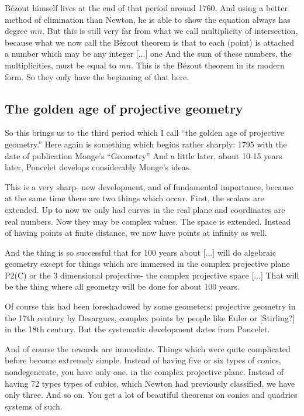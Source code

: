 \documentclass{article}
\begin{document}
B\'ezout himself lives 
at the end of that period around 1760.
And using a better method of elimination than Newton,
he is able to show the equation always has degree $mn$.
But this is still very far 
from what we call multiplicity of intersection,
because what we now call the B\'ezout theorem 
is that to each (point) is attached a number 
which may be any integer [...] one
And the sum of these numbers, the multiplicities, 
must be equal to $mn$.
This is the B\'ezout theorem in its modern form.
So they only have the beginning of that here.

\subsection{The golden age of projective geometry}
So this brings us to the third period
which I call ``the golden age of projective geometry.''
Here again is something which begins rather sharply:
1795 with the date of publication Monge's ``Geometry''
And a little later, about 10-15 years later,
Poncelet develops considerably Monge's ideas.

This is a very sharp- new development,
and of fundamental importance, because
at the same time there are two things which occur.
First, the scalars are extended.
Up to now we only had curves in the real plane 
and coordinates are real numbers.
Now they may be complex values.
The space is extended.
Instead of having points at finite distance, 
we now have points at infinity as well.

And the thing is so successful that for 100 years about [...] 
will do algebraic geometry 
except for things which are immersed 
in the complex projective plane P2(C) 
or the 3 dimensional projective- 
the complex projective space [...]
That will be the thing 
where all geometry will be done for about 100 years.

Of course this had been foreshadowed by some geometers:
projective geometry in the 17th century by Desargues,
complex points by people like Euler or [Stirling?] 
in the 18th century.
But the systematic development dates from Poncelet.

And of course the rewards are immediate.
Things which were quite complicated before 
become extremely simple.
Instead of having five or six types of conics, 
nondegenerate, you have only one. 
in the complex projective plane.
Instead of having 72 types types of cubics, 
which Newton had previously classified,  
we have only three.
And so on.
You get a lot of beautiful theorems 
on conics and quadrics systems of such.
\end{document}
